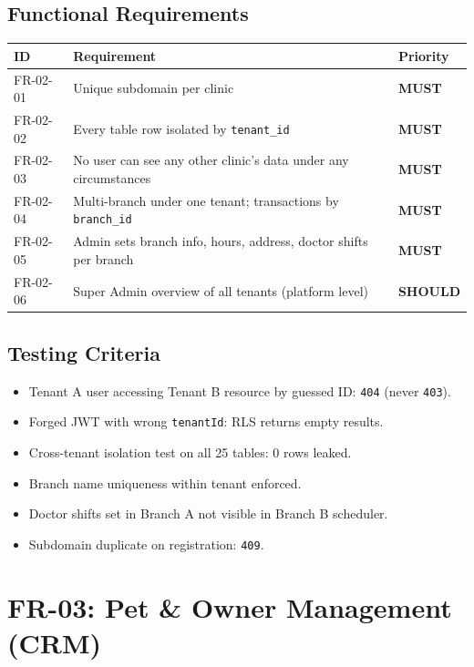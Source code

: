 \documentclass[12pt,a4paper]{report}
\newcommand{\must}{\colorbox{red!15}{\color{errorred}\textbf{\small MUST}}}
\newcommand{\should}{\colorbox{orange!15}{\color{warnorange}\textbf{\small SHOULD}}}
\newcommand{\testcheck}{\textcolor{successgreen}{\ding{51}}}
\begin{document}
\section{Functional Requirements}

\begin{longtable}{L{2.5cm} L{9cm} C{2cm}}
\toprule
\textbf{ID} & \textbf{Requirement} & \textbf{Priority} \\\midrule\endhead\bottomrule\endfoot
FR-02-01 & Unique subdomain per clinic & \must \\
FR-02-02 & Every table row isolated by \texttt{tenant\_id} & \must \\
FR-02-03 & No user can see any other clinic's data under any circumstances & \must \\
FR-02-04 & Multi-branch under one tenant; transactions by \texttt{branch\_id} & \must \\
FR-02-05 & Admin sets branch info, hours, address, doctor shifts per branch & \must \\
FR-02-06 & Super Admin overview of all tenants (platform level) & \should \\
\end{longtable}

\section{Testing Criteria}

\begin{itemize}
  \item[\testcheck] Tenant A user accessing Tenant B resource by guessed ID: \texttt{404} (never \texttt{403}).
  \item[\testcheck] Forged JWT with wrong \texttt{tenantId}: RLS returns empty results.
  \item[\testcheck] Cross-tenant isolation test on all 25 tables: 0 rows leaked.
  \item[\testcheck] Branch name uniqueness within tenant enforced.
  \item[\testcheck] Doctor shifts set in Branch A not visible in Branch B scheduler.
  \item[\testcheck] Subdomain duplicate on registration: \texttt{409}.
\end{itemize}

\chapter{FR-03: Pet \& Owner Management (CRM)}
\end{document}
